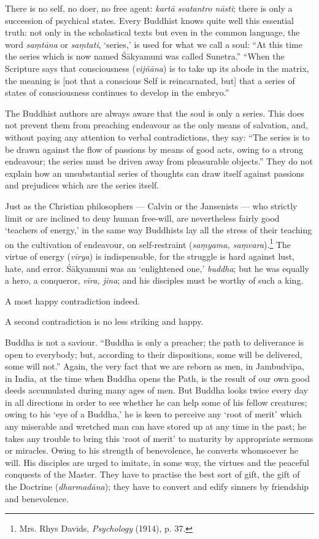 \documentclass[a4paper, 11pt, oneside, english]{article}
\begin{document}
There is no self, no doer, no free agent: \emph{kartā svatantro nāsti}; there is only a succession of psychical states. Every Buddhist knows quite well this essential truth: not only in the scholastical texts but even in the common language, the word \emph{saṃtāna} or \emph{saṃtati}, `series,' is used for what we call a soul: ``At this time the series which is now named Śākyamuni was called Sunetra.'' ``When the Scripture says that consciousness (\emph{vijñāna}) is to take up its abode in the matrix, the meaning is [not that a conscious Self is reincarnated, but] that a series of states of consciousness continues to develop in the embryo.''

The Buddhist authors are always aware that the soul is only a series. This does not prevent them from preaching endeavour as the only means of salvation, and, without paying any attention to verbal contradictions, they say: ``The series is to be drawn against the flow of passions by means of good acts, owing to a strong endeavour; the series must be driven away from pleasurable objects.'' They do not explain how an unsubstantial series of thoughts can draw itself against passions and prejudices which are the series itself.

Just as the Christian philosophers --- Calvin or the Jansenists --- who strictly limit or are inclined to deny human free-will, are nevertheless fairly good `teachers of energy,' in the same way Buddhists lay all the stress of their teaching on the cultivation of endeavour, on self-restraint (\emph{saṃyama, saṃvara}).\footnote{Mrs. Rhys Davids, \emph{Psychology} (1914), p. 37.} The virtue of energy (\emph{vīrya}) is indispensable, for the struggle is hard against lust, hate, and error. Śākyamuni was an `enlightened one,' \emph{buddha}; but he was equally a hero, a conqueror, \emph{vīra, jina}; and his disciples must be worthy of such a king.

A most happy contradiction indeed.

A second contradiction is no less striking and happy.

Buddha is not a saviour. ``Buddha is only a preacher; the path to deliverance is open to everybody; but, according to their dispositions, some will be delivered, some will not.'' Again, the very fact that we are reborn as men, in Jambudvīpa, in India, at the time when Buddha opens the Path, is the result of our own good deeds accumulated during many ages of men. But Buddha looks twice every day in all directions in order to see whether he can help some of his fellow creatures; owing to his `eye of a Buddha,' he is keen to perceive any `root of merit' which any miserable and wretched man can have stored up at any time in the past; he takes any trouble to bring this `root of merit' to maturity by appropriate sermons or miracles. Owing to his strength of benevolence, he converts whomsoever he will. His disciples are urged to imitate, in some way, the virtues and the peaceful conquests of the Master. They have to practise the best sort of gift, the gift of the Doctrine (\emph{dharmadāna}); they have to convert and edify sinners by friendship and benevolence.
\end{document}
